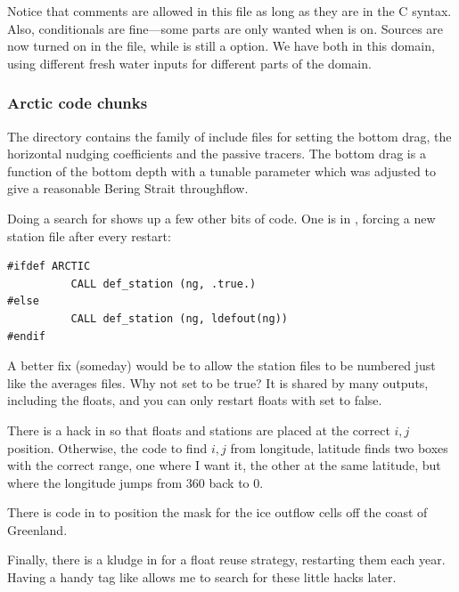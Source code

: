 Notice that comments are allowed in this file as long as they are in
the C syntax. Also, conditionals are fine---some parts are only
wanted when  is on. Sources are now turned on in the
 file, while  is still a
 option. We have both in this domain, using different
fresh water inputs for different parts of the domain.

\subsubsection{Arctic code chunks}
The  directory contains the 
family of include files for setting the bottom drag, the horizontal
nudging coefficients and the passive tracers. The bottom drag is a
function of the bottom depth with a tunable parameter which was
adjusted to give a reasonable Bering Strait throughflow.

Doing a search for  shows up a few other bits of code. One
is in , forcing a new station file after every
restart:
\begin{verbatim}
#ifdef ARCTIC
          CALL def_station (ng, .true.)
#else
          CALL def_station (ng, ldefout(ng))
#endif
\end{verbatim}
A better fix (someday) would be to allow the station files to be
numbered just like the averages files. Why not set  to
be true? It is shared by many outputs, including the floats, and you
can only restart floats with  set to false.

There is a hack in  so that floats and stations
are placed at the correct $i,j$ position. Otherwise, the code to
find $i,j$ from longitude, latitude finds two boxes with the correct
range, one where I want it, the other at the same latitude, but
where the longitude jumps from 360 back to 0.

There is code in  to position the mask for
the ice outflow cells off the coast of Greenland.

Finally, there is a kludge in  for a
float reuse strategy, restarting them each year. Having a handy tag like
 allows me to search for these little hacks later.

